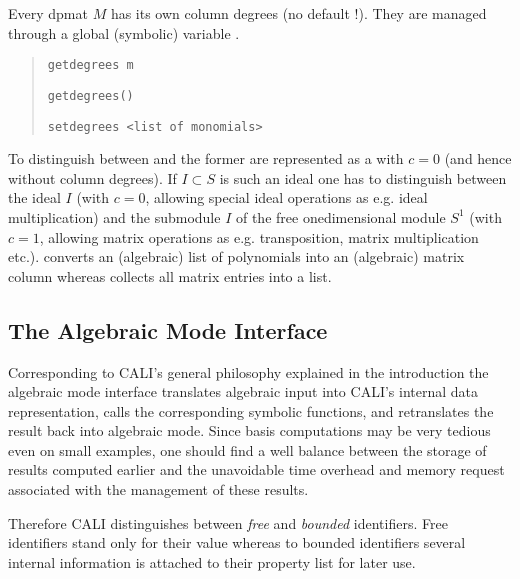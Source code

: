 Every dpmat $M$ has its own column degrees (no default !).  They are
managed through a global (symbolic) variable .
\begin{quote}
\verb|getdegrees m| 


\verb|getdegrees()| 


\verb|setdegrees <list of monomials>|  

\end{quote}

To distinguish between  and  the former are
represented as a  with $c=0$ (and hence without column
degrees).  If $I \subset S$ is such an ideal one has to distinguish
between the ideal $I$ (with $c=0$, allowing special ideal operations
as e.g. ideal multiplication) and the submodule $I$ of the free
onedimensional module $S^1$ (with $c=1$, allowing matrix operations
as e.g.  transposition, matrix multiplication etc.). 
converts an (algebraic) list of polynomials into an (algebraic)
matrix column whereas  collects all matrix entries into
a list.

\subsection{The Algebraic Mode Interface}

Corresponding to CALI's general philosophy explained in the
introduction the algebraic mode interface translates algebraic input
into CALI's internal data representation, calls the corresponding
symbolic functions, and retranslates the result back into algebraic
mode. Since \gr basis computations may be very tedious even on small
examples, one should find a well balance between the storage of
results computed earlier and the unavoidable time overhead and memory
request associated with the management of these results.

Therefore CALI distinguishes between {\em free} and {\em bounded}
 identifiers. Free
identifiers stand only for their value whereas to bounded identifiers
several internal information is attached to their property list for
later use.
\medskip

